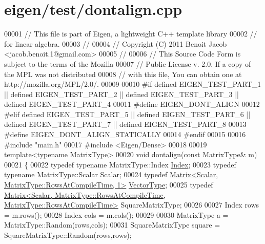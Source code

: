 \hypertarget{eigen_2test_2dontalign_8cpp_source}{}\section{eigen/test/dontalign.cpp}
\label{eigen_2test_2dontalign_8cpp_source}

\begin{DoxyCode}
00001 \textcolor{comment}{// This file is part of Eigen, a lightweight C++ template library}
00002 \textcolor{comment}{// for linear algebra.}
00003 \textcolor{comment}{//}
00004 \textcolor{comment}{// Copyright (C) 2011 Benoit Jacob <jacob.benoit.1@gmail.com>}
00005 \textcolor{comment}{//}
00006 \textcolor{comment}{// This Source Code Form is subject to the terms of the Mozilla}
00007 \textcolor{comment}{// Public License v. 2.0. If a copy of the MPL was not distributed}
00008 \textcolor{comment}{// with this file, You can obtain one at http://mozilla.org/MPL/2.0/.}
00009 
00010 \textcolor{preprocessor}{#if defined EIGEN\_TEST\_PART\_1 || defined EIGEN\_TEST\_PART\_2 || defined EIGEN\_TEST\_PART\_3 || defined
       EIGEN\_TEST\_PART\_4}
00011 \textcolor{preprocessor}{#define EIGEN\_DONT\_ALIGN}
00012 \textcolor{preprocessor}{#elif defined EIGEN\_TEST\_PART\_5 || defined EIGEN\_TEST\_PART\_6 || defined EIGEN\_TEST\_PART\_7 || defined
       EIGEN\_TEST\_PART\_8}
00013 \textcolor{preprocessor}{#define EIGEN\_DONT\_ALIGN\_STATICALLY}
00014 \textcolor{preprocessor}{#endif}
00015 
00016 \textcolor{preprocessor}{#include "main.h"}
00017 \textcolor{preprocessor}{#include <Eigen/Dense>}
00018 
00019 \textcolor{keyword}{template}<\textcolor{keyword}{typename} MatrixType>
00020 \textcolor{keywordtype}{void} dontalign(\textcolor{keyword}{const} MatrixType& m)
00021 \{
00022   \textcolor{keyword}{typedef} \textcolor{keyword}{typename} MatrixType::Index \hyperlink{namespace_eigen_a62e77e0933482dafde8fe197d9a2cfde}{Index};
00023   \textcolor{keyword}{typedef} \textcolor{keyword}{typename} MatrixType::Scalar Scalar;
00024   \textcolor{keyword}{typedef} \hyperlink{group___core___module_class_eigen_1_1_matrix}{Matrix<Scalar, MatrixType::RowsAtCompileTime, 1>} 
      \hyperlink{struct_vector_type}{VectorType};
00025   \textcolor{keyword}{typedef} 
      \hyperlink{group___core___module_class_eigen_1_1_matrix}{Matrix<Scalar, MatrixType::RowsAtCompileTime, MatrixType::RowsAtCompileTime>}
       SquareMatrixType;
00026 
00027   Index rows = m.rows();
00028   Index cols = m.cols();
00029 
00030   MatrixType a = MatrixType::Random(rows,cols);
00031   SquareMatrixType square = SquareMatrixType::Random(rows,rows);

\end{DoxyCode}
